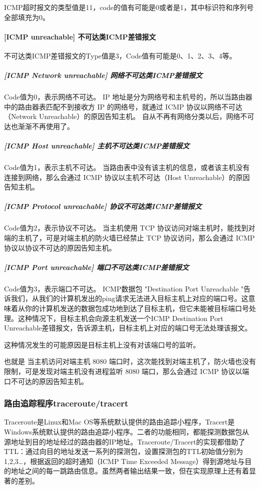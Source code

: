 \documentclass[a4paper,12pt]{report}
\begin{document}
\begin{spacing}{1.5}
ICMP超时报文的类型值是11，code的值有可能是0或者是1，其中标识符和序列号全部填充为0。


\paragraph*{[ICMP unreachable] 不可达类ICMP差错报文}
不可达类ICMP差错报文的Type值是3，Code值有可能是0、1、2、3、4等。

\subparagraph{[ICMP Network unreachable] 网络不可达类ICMP差错报文}
Code值为0，表示网络不可达。
IP 地址是分为网络号和主机号的，所以当路由器中的路由器表匹配不到接收方 IP 的网络号，就通过 ICMP 协议以网络不可达（Network Unreachable）的原因告知主机。
自从不再有网络分类以后，网络不可达也渐渐不再使用了。


\subparagraph{[ICMP Host unreachable] 主机不可达类ICMP差错报文}

Code值为1，表示主机不可达。
当路由表中没有该主机的信息，或者该主机没有连接到网络，那么会通过 ICMP 协议以主机不可达（Host Unreachable）的原因告知主机。
\subparagraph{[ICMP Protocol unreachable] 协议不可达类ICMP差错报文}
Code值为2，表示协议不可达。
当主机使用 TCP 协议访问对端主机时，能找到对端的主机了，可是对端主机的防火墙已经禁止 TCP 协议访问，那么会通过 ICMP 协议以协议不可达的原因告知主机。

\subparagraph{[ICMP Port unreachable] 端口不可达类ICMP差错报文}
Code值为3，表示端口不可达。
ICMP数据包 "Destination Port Unreachable "告诉我们，从我们的计算机发出的ping请求无法进入目标主机上对应的端口号。这意味着从你的计算机发送的数据包成功地到达了目标主机，但它未能被目标端口号处理。这种情况下，目标主机会向源主机发送一个ICMP Destination Port Unreachable差错报文，告诉源主机，目标主机上对应的端口号无法处理该报文。

这种情况发生的可能原因是目标主机上没有对该端口号的监听。

也就是 当主机访问对端主机 8080 端口时，这次能找到对端主机了，防火墙也没有限制，可是发现对端主机没有进程监听 8080 端口，那么会通过 ICMP 协议以端口不可达的原因告知主机。



\subsubsection{路由追踪程序traceroute/tracert}

Traceroute是Linux和Mac OS等系统默认提供的路由追踪小程序，Tracert是Windows系统默认提供的路由追踪小程序。二者的功能相同，都能探测数据包从源地址到目的地址经过的路由器的IP地址。Traceroute/Tracert的实现都借助了TTL：通过向目的地址发送一系列的探测包，设置探测包的TTL初始值分别为1,2,3…，根据返回的超时通知（ICMP Time Exceeded Message）得到源地址与目的地址之间的每一跳路由信息。虽然两者输出结果一致，但在实现原理上还有着显著的差别。


\end{spacing}
\end{document}
